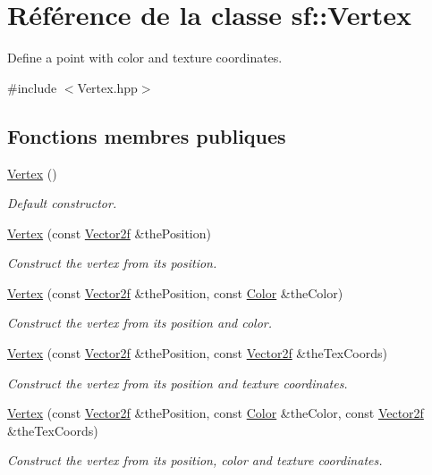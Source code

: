 \hypertarget{classsf_1_1Vertex}{}\section{Référence de la classe sf\+:\+:Vertex}
\label{classsf_1_1Vertex}


Define a point with color and texture coordinates.  




{\ttfamily \#include $<$Vertex.\+hpp$>$}

\subsection*{Fonctions membres publiques}
\begin{DoxyCompactItemize}
\item 
\mbox{\label{classsf_1_1Vertex_a6b4c79cd69f7ec1296fede536f39e9c8}} 
\hyperlink{classsf_1_1Vertex_a6b4c79cd69f7ec1296fede536f39e9c8}{Vertex} ()
\begin{DoxyCompactList}\small\item\em Default constructor. \end{DoxyCompactList}\item 
\hyperlink{classsf_1_1Vertex_a4dccc5c351b73b6fac169fe442535b40}{Vertex} (const \hyperlink{classsf_1_1Vector2}{Vector2f} \&the\+Position)
\begin{DoxyCompactList}\small\item\em Construct the vertex from its position. \end{DoxyCompactList}\item 
\hyperlink{classsf_1_1Vertex_a70b0679b4ec531d5bd1a7d0225c7321a}{Vertex} (const \hyperlink{classsf_1_1Vector2}{Vector2f} \&the\+Position, const \hyperlink{classsf_1_1Color}{Color} \&the\+Color)
\begin{DoxyCompactList}\small\item\em Construct the vertex from its position and color. \end{DoxyCompactList}\item 
\hyperlink{classsf_1_1Vertex_ab9bf849c4c0d82d09bf5bece23d2456a}{Vertex} (const \hyperlink{classsf_1_1Vector2}{Vector2f} \&the\+Position, const \hyperlink{classsf_1_1Vector2}{Vector2f} \&the\+Tex\+Coords)
\begin{DoxyCompactList}\small\item\em Construct the vertex from its position and texture coordinates. \end{DoxyCompactList}\item 
\hyperlink{classsf_1_1Vertex_ad5943f2b3cbc64b6e714bb37ccaf4960}{Vertex} (const \hyperlink{classsf_1_1Vector2}{Vector2f} \&the\+Position, const \hyperlink{classsf_1_1Color}{Color} \&the\+Color, const \hyperlink{classsf_1_1Vector2}{Vector2f} \&the\+Tex\+Coords)
\begin{DoxyCompactList}\small\item\em Construct the vertex from its position, color and texture coordinates. \end{DoxyCompactList}\end{DoxyCompactItemize}
